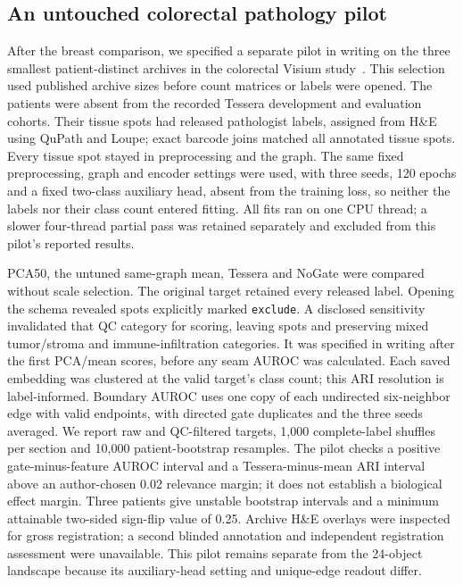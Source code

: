 \documentclass[11pt]{article}
\begin{document}
\subsection{An untouched colorectal pathology pilot}
After the breast comparison, we specified a separate pilot in writing on the three smallest patient-distinct archives in the colorectal Visium study~\citep{valdeolivas2024crc}. This selection used published archive sizes before count matrices or labels were opened. The patients were absent from the recorded Tessera development and evaluation cohorts. Their \CrcTissueSpots{} tissue spots had \CrcLabeledSpots{} released pathologist labels, assigned from H\&E using QuPath and Loupe; exact barcode joins matched all annotated tissue spots. Every tissue spot stayed in preprocessing and the graph. The same fixed preprocessing, graph and encoder settings were used, with three seeds, 120 epochs and a fixed two-class auxiliary head, absent from the training loss, so neither the labels nor their class count entered fitting. All fits ran on one CPU thread; a slower four-thread partial pass was retained separately and excluded from this pilot's reported results.

PCA50, the untuned same-graph mean, Tessera and NoGate were compared without scale selection. The original target retained every released label. Opening the schema revealed \CrcQcExcluded{} spots explicitly marked \texttt{exclude}. A disclosed sensitivity invalidated that QC category for scoring, leaving \CrcQcSpots{} spots and preserving mixed tumor/stroma and immune-infiltration categories. It was specified in writing after the first PCA/mean scores, before any seam AUROC was calculated. Each saved embedding was clustered at the valid target's class count; this ARI resolution is label-informed. Boundary AUROC uses one copy of each undirected six-neighbor edge with valid endpoints, with directed gate duplicates and the three seeds averaged. We report raw and QC-filtered targets, 1,000 complete-label shuffles per section and 10,000 patient-bootstrap resamples. The pilot checks a positive gate-minus-feature AUROC interval and a Tessera-minus-mean ARI interval above an author-chosen 0.02 relevance margin; it does not establish a biological effect margin. Three patients give unstable bootstrap intervals and a minimum attainable two-sided sign-flip value of 0.25. Archive H\&E overlays were inspected for gross registration; a second blinded annotation and independent registration assessment were unavailable. This pilot remains separate from the 24-object landscape because its auxiliary-head setting and unique-edge readout differ.
\end{document}
